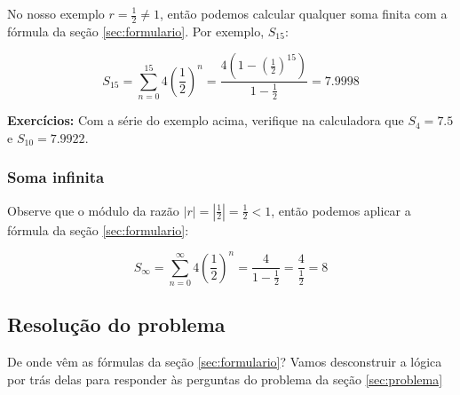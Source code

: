 \documentclass[a4paper]{article}
\begin{document}
No nosso exemplo $r = \frac{1}{2} \ne 1$, então podemos calcular
qualquer soma finita com a fórmula da seção \ref{sec:formulario}. Por
exemplo, $S_{15}$:

\begin{displaymath}
  S_{15} = \sum_{n=0}^{15} 4\left(\frac{1}{2}\right)^n =
  \frac{4\left(1-\left(\frac{1}{2}\right)^{15}\right)}{1-\frac{1}{2}} = 7.9998
\end{displaymath}

{\bf Exercícios:} Com a série do exemplo acima, verifique na
calculadora que $S_4=7.5$ e $S_{10}=7.9922$.

\subsubsection{Soma infinita}

Observe que o módulo da razão
$|r|=\left|\frac{1}{2}\right|=\frac{1}{2} <1$, então podemos aplicar a
fórmula da seção \ref{sec:formulario}:

\begin{displaymath}
  S_\infty = \sum_{n=0}^\infty 4\left(\frac{1}{2}\right)^n =
  \frac{4}{1-\frac{1}{2}} = \frac{4}{\frac{1}{2}} = 8
\end{displaymath}

\subsection{Resolução do problema}

De onde vêm as fórmulas da seção \ref{sec:formulario}? Vamos
desconstruir a lógica por trás delas para responder às perguntas do
problema da seção \ref{sec:problema}
\end{document}
